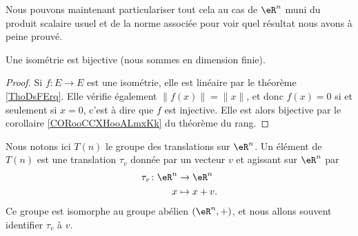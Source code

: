 Nous pouvons maintenant particulariser tout cela au cas de \( \eR^n\) muni du produit scalaire usuel et de la norme associée pour voir quel résultat nous avons à peine prouvé.

\begin{lemma}        \label{LEMooJPYZooHETCqt}
    Une isométrie est bijective (nous sommes en dimension finie).
\end{lemma}

\begin{proof}
    Si \( f\colon E\to E\) est une isométrie, elle est linéaire par le théorème \ref{ThoDsFErq}. Elle vérifie également \( \| f(x) \|=\| x \|\), et donc \( f(x)=0\) si et seulement si \( x=0\), c'est à dire que \( f\) est injective. Elle est alors bijective par le corollaire \ref{CORooCCXHooALmxKk} du théorème du rang.
\end{proof}

Nous notons ici \( T(n)\) le groupe des translations sur \( \eR^n\). Un élément de \( T(n)\) est une translation \( \tau_v\) donnée par un vecteur \( v\) et agissant sur \( \eR^n\) par
\begin{equation}
    \begin{aligned}
        \tau_v\colon \eR^n&\to \eR^{n} \\
        x&\mapsto x+v. 
    \end{aligned}
\end{equation}
Ce groupe est isomorphe au groupe abélien \( (\eR^n,+)\), et nous allons souvent identifier \( \tau_v\) à \( v\).

